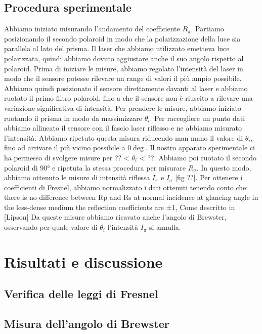 \documentclass[12pt, a4paper, twoside]{article}
\begin{document}
  \subsection{Procedura sperimentale}\label{subsec:procedura-sperimentale}
    Abbiamo iniziato misurando l’andamento del coefficiente $R_\pi$. Partiamo posizionando il secondo polaroid in modo che la polarizzazione della luce sia parallela al lato del prisma. Il laser che abbiamo utilizzato emetteva luce polarizzata, quindi abbiamo dovuto aggiustare anche il suo angolo rispetto al polaroid. Prima di iniziare le misure, abbiamo regolato l’intensità del laser in modo che il sensore potesse rilevare un range di valori il più ampio possibile. Abbiamo quindi posizionato il sensore direttamente davanti al laser e abbiamo ruotato il primo filtro polaroid, fino a che il sensore non è riuscito a rilevare una variazione significativa di intensità.
    Per prendere le misure, abbiamo iniziato ruotando il prisma in modo da massimizzare $\theta_i$. Per raccogliere un
    punto dati abbiamo allineato il sensore con il fascio laser riflesso e ne abbiamo misurato l’intensità. Abbiamo
    ripetuto questa misura riducendo man mano il valore di $\theta_i$, fino ad arrivare il più vicino possibile a $0\deg$.
    Il nostro apparato sperimentale ci ha permesso di svolgere misure per ?? < $\theta_i$ < ??.
    Abbiamo poi ruotato il secondo polaroid di 90° e ripetuta la stessa procedura per misurare $R_\sigma$.
    In questo modo, abbiamo ottenuto le misure di intensità riflessa $I_\pi$ e $I_\sigma$ [fig ??]. Per ottenere i
    coefficienti di Fresnel, abbiamo normalizzato i dati ottenuti tenendo conto che:
    there is no difference between Rp and Rs at normal incidence
    at glancing angle in the less-dense medium the reflection coefficients are ±1,
    Come descritto in [Lipson]
    Da queste misure abbiamo ricavato anche l’angolo di Brewster, osservando per quale valore di $\theta_i$
    l’intensità $I_\pi$ si annulla.


\section{Risultati e discussione}\label{sec:risultati-e-discussione}
  \subsection{Verifica delle leggi di Fresnel}\label{subsec:leggi-di-fresnel}
    \blindtext[2]
  \subsection{Misura dell'angolo di Brewster}\label{subsec:angolo-di-brewster}
    \blindtext[2]
\end{document}
